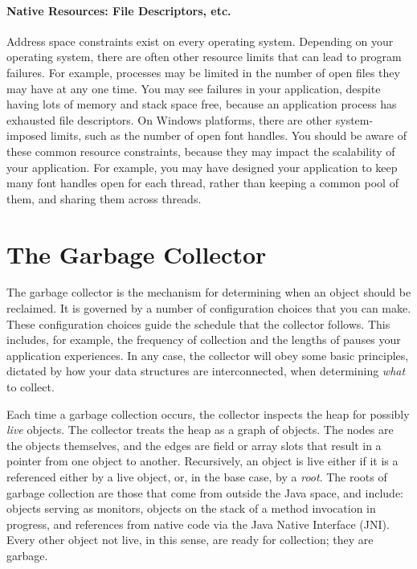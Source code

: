 \paragraph{Native Resources: File Descriptors, etc.}
Address space constraints exist on every operating system. Depending on your
operating system, there are often other resource limits that can lead to program
failures. For example, processes may be limited in the number of open files they
may have at any one time. You may see failures in your application, despite
having lots of memory and stack space free, because an application process has
exhausted file descriptors. On Windows platforms, there are other system-imposed
limits, such as the number of open font handles. You should be aware of these
common resource constraints, because they may impact the scalability of your
application. For example, you may have designed your application to keep many
font handles open for each thread, rather than keeping a common pool of them,
and sharing them across threads.

\section{The Garbage Collector}
The garbage collector is the mechanism for determining when an object should be
reclaimed. It is governed by a number of configuration choices that you can make.
These configuration choices guide the schedule that the collector follows. This
includes, for example, the frequency of collection and the lengths of pauses your
application experiences. In any case, the collector will obey some basic
principles, dictated by how your data structures are interconnected, when
determining \emph{what} to collect.

Each time a garbage collection occurs, the collector inspects the heap for
possibly \emph{live} objects. The collector treats the heap as a graph of
objects. The nodes are the objects themselves, and the edges are field or array
slots that result in a pointer from one object to another.  Recursively, an object is live either if it is a referenced
either by a live object, or, in the base case, by a \emph{root}. The roots of
garbage collection are those that come from outside the Java space, and include:
objects serving as monitors, objects on the stack of a method invocation in
progress, and references from native code via the Java Native Interface (JNI).
Every other object not live, in this sense, are ready for collection; they are
garbage.

